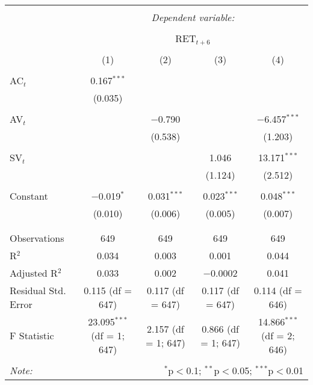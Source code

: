 
\begin{table}[!htbp] \centering 
  \caption{} 
  \label{} 
\begin{tabular}{@{\extracolsep{5pt}}lcccc} 
\\[-1.8ex]\hline 
\hline \\[-1.8ex] 
 & \multicolumn{4}{c}{\textit{Dependent variable:}} \\ 
\cline{2-5} 
\\[-1.8ex] & \multicolumn{4}{c}{RET$_{t+6}$} \\ 
\\[-1.8ex] & (1) & (2) & (3) & (4)\\ 
\hline \\[-1.8ex] 
 AC$_{t}$ & 0.167$^{***}$ &  &  &  \\ 
  & (0.035) &  &  &  \\ 
  & & & & \\ 
 AV$_{t}$ &  & $-$0.790 &  & $-$6.457$^{***}$ \\ 
  &  & (0.538) &  & (1.203) \\ 
  & & & & \\ 
 SV$_{t}$ &  &  & 1.046 & 13.171$^{***}$ \\ 
  &  &  & (1.124) & (2.512) \\ 
  & & & & \\ 
 Constant & $-$0.019$^{*}$ & 0.031$^{***}$ & 0.023$^{***}$ & 0.048$^{***}$ \\ 
  & (0.010) & (0.006) & (0.005) & (0.007) \\ 
  & & & & \\ 
\hline \\[-1.8ex] 
Observations & 649 & 649 & 649 & 649 \\ 
R$^{2}$ & 0.034 & 0.003 & 0.001 & 0.044 \\ 
Adjusted R$^{2}$ & 0.033 & 0.002 & $-$0.0002 & 0.041 \\ 
Residual Std. Error & 0.115 (df = 647) & 0.117 (df = 647) & 0.117 (df = 647) & 0.114 (df = 646) \\ 
F Statistic & 23.095$^{***}$ (df = 1; 647) & 2.157 (df = 1; 647) & 0.866 (df = 1; 647) & 14.866$^{***}$ (df = 2; 646) \\ 
\hline 
\hline \\[-1.8ex] 
\textit{Note:}  & \multicolumn{4}{r}{$^{*}$p$<$0.1; $^{**}$p$<$0.05; $^{***}$p$<$0.01} \\ 
\end{tabular} 
\end{table} 
